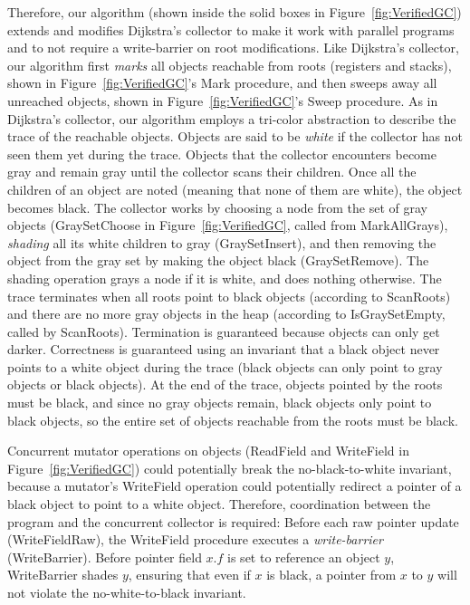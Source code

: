 Therefore, our algorithm (shown inside the solid boxes in Figure~\ref{fig:VerifiedGC}) extends and modifies Dijkstra's collector
to make it work with parallel programs and to not require a write-barrier on root modifications.
Like Dijkstra's collector, our algorithm first {\em marks} all objects reachable from roots (registers and stacks),
shown in Figure~\ref{fig:VerifiedGC}'s Mark procedure, and then sweeps away all unreached objects,
shown in Figure~\ref{fig:VerifiedGC}'s Sweep procedure.
As in Dijkstra's collector, our algorithm employs a tri-color abstraction to describe the trace of the reachable objects.
Objects are said to be {\em white} if the collector has not seen them yet during the trace.
Objects that the collector encounters become gray and remain gray until the collector scans their children.
Once all the children of an object are noted (meaning that none of them are white), the object becomes black.
The collector works by choosing a node from the set of gray objects (GraySetChoose in Figure~\ref{fig:VerifiedGC}, called from MarkAllGrays),
{\em shading} all its white children to gray (GraySetInsert), and then removing the object from the gray set by making the object black (GraySetRemove).
The shading operation grays a node if it is white, and does nothing otherwise.
The trace terminates when all roots point to black objects (according to ScanRoots)
and there are no more gray objects in the heap (according to IsGraySetEmpty, called by ScanRoots).
Termination is guaranteed because objects can only get darker.
Correctness is guaranteed using an invariant that a black object never points to a white object during the trace
(black objects can only point to gray objects or black objects).
At the end of the trace, objects pointed by the roots must be black, and since no gray objects remain,
black objects only point to black objects,
so the entire set of objects reachable from the roots must be black.

Concurrent mutator operations on objects (ReadField and WriteField in Figure~\ref{fig:VerifiedGC})
could potentially break the no-black-to-white invariant,
because a mutator's WriteField operation could potentially redirect a pointer of a black object to point to a white object.
Therefore, coordination between the program and the concurrent collector is required:
Before each raw pointer update (WriteFieldRaw), the WriteField procedure executes a {\em write-barrier} (WriteBarrier).
Before pointer field $x.f$ is set to reference an object $y$,
WriteBarrier shades $y$, ensuring that even if $x$ is black, a pointer from $x$ to $y$
will not violate the no-white-to-black invariant.

